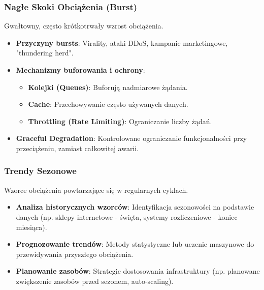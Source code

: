 \documentclass[aspectratio=169,xcolor=table]{beamer}
\begin{document}
\begin{frame}
  \frametitle{Nagłe Skoki Obciążenia (Burst)}
  Gwałtowny, często krótkotrwały wzrost obciążenia.
  \begin{itemize}
    \item \textbf{Przyczyny bursts}: Virality, ataki DDoS, kampanie marketingowe, "thundering herd".
    \item \textbf{Mechanizmy buforowania i ochrony}:
        \begin{itemize}
            \item \textbf{Kolejki (Queues)}: Buforują nadmiarowe żądania.
            \item \textbf{Cache}: Przechowywanie często używanych danych.
            \item \textbf{Throttling (Rate Limiting)}: Ograniczanie liczby żądań.
        \end{itemize}
    \item \textbf{Graceful Degradation}: Kontrolowane ograniczanie funkcjonalności przy przeciążeniu, zamiast całkowitej awarii.
  \end{itemize}
\end{frame}

\begin{frame}
  \frametitle{Trendy Sezonowe}
  Wzorce obciążenia powtarzające się w regularnych cyklach.
  \begin{itemize}
    \item \textbf{Analiza historycznych wzorców}: Identyfikacja sezonowości na podstawie danych (np. sklepy internetowe - święta, systemy rozliczeniowe - koniec miesiąca).
    \item \textbf{Prognozowanie trendów}: Metody statystyczne lub uczenie maszynowe do przewidywania przyszłego obciążenia.
    \item \textbf{Planowanie zasobów}: Strategie dostosowania infrastruktury (np. planowane zwiększenie zasobów przed sezonem, auto-scaling).
  \end{itemize}
\end{frame}
\end{document}
